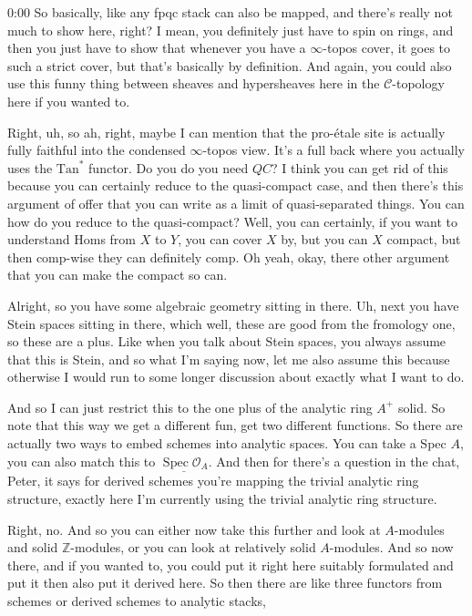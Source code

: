 \begin{unfinished}{0:00}
So basically, like any fpqc stack can also be mapped, and there's really not much to show here, right? I mean, you definitely just have to spin on rings, and then you just have to show that whenever you have a $\infty$-topos cover, it goes to such a strict cover, but that's basically by definition. And again, you could also use this funny thing between sheaves and hypersheaves here in the $\mathcal{C}$-topology here if you wanted to.

Right, uh, so ah, right, maybe I can mention that the pro-étale site is actually fully faithful into the condensed $\infty$-topos view. It's a full back where you actually uses the $\mathrm{Tan}^{*}$ functor. Do you do you need $QC$? I think you can get rid of this because you can certainly reduce to the quasi-compact case, and then there's this argument of offer that you can write as a limit of quasi-separated things. You can how do you reduce to the quasi-compact? Well, you can certainly, if you want to understand Homs from $X$ to $Y$, you can cover $X$ by, but you can $X$ compact, but then comp-wise they can definitely comp. Oh yeah, okay, there other argument that you can make the compact so can.

Alright, so you have some algebraic geometry sitting in there. Uh, next you have Stein spaces sitting in there, which well, these are good from the fromology one, so these are a plus. Like when you talk about Stein spaces, you always assume that this is Stein, and so what I'm saying now, let me also assume this because otherwise I would run to some longer discussion about exactly what I want to do.

And so I can just restrict this to the one plus of the analytic ring $A^{+}$ solid. So note that this way we get a different fun, get two different functions. So there are actually two ways to embed schemes into analytic spaces. You can take a Spec $A$, you can also match this to $\underline{\operatorname{Spec} \mathcal{O}_{A}}$. And then for there's a question in the chat, Peter, it says for derived schemes you're mapping the trivial analytic ring structure, exactly here I'm currently using the trivial analytic ring structure.

Right, no. And so you can either now take this further and look at $A$-modules and solid $\mathbb{Z}$-modules, or you can look at relatively solid $A$-modules. And so now there, and if you wanted to, you could put it right here suitably formulated and put it then also put it derived here. So then there are like three functors from schemes or derived schemes to analytic stacks,


\end{unfinished}

